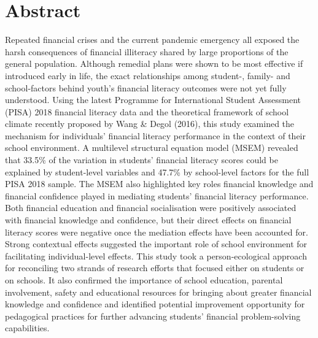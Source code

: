 \section*{Abstract}

\noindent Repeated financial crises and the current pandemic emergency all exposed the harsh consequences of financial illiteracy shared by large proportions of the general population. Although remedial plans were shown to be most effective if introduced early in life, the exact relationships among student-, family- and school-factors behind youth's financial literacy outcomes were not yet fully understood. Using the latest Programme for International Student Assessment (PISA) 2018 financial literacy data and the theoretical framework of school climate recently proposed by Wang \& Degol (2016), this study examined the mechanism for individuals' financial literacy performance in the context of their school environment. A multilevel structural equation model (MSEM) revealed that 33.5\% of the variation in students' financial literacy scores could be explained by student-level variables and 47.7\% by school-level factors for the full PISA 2018 sample. The MSEM also highlighted key roles financial knowledge and financial confidence played in mediating students' financial literacy performance. Both financial education and financial socialisation were positively associated with financial knowledge and confidence, but their direct effects on financial literacy scores were negative once the mediation effects have been accounted for. Strong contextual effects suggested the important role of school environment for facilitating individual-level effects. This study took a person-ecological approach for reconciling two strands of research efforts that focused either on students or on schools. It also confirmed the importance of school education, parental involvement, safety and educational resources for bringing about greater financial knowledge and confidence and identified potential improvement opportunity for pedagogical practices for further advancing students' financial problem-solving capabilities.